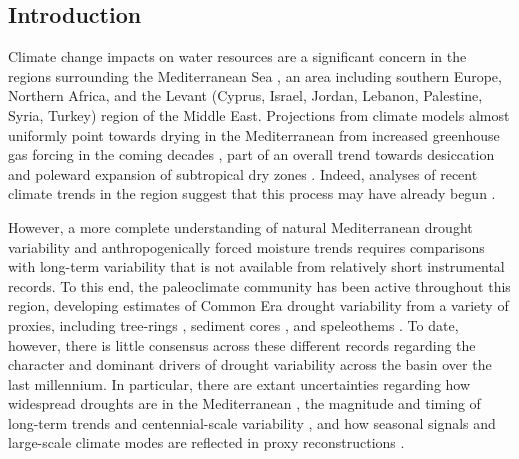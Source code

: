 \documentclass[draft,jgr]{AGUTeX}
\begin{document}
\begin{article}

\section{Introduction}
\noindent Climate change impacts on water resources are a significant concern in the regions surrounding the Mediterranean Sea \citep{Iglesias2007,GarciaRuiz2011}, an area including southern Europe, Northern Africa, and the Levant (Cyprus, Israel, Jordan, Lebanon, Palestine, Syria, Turkey) region of the Middle East. Projections from climate models almost uniformly point towards drying in the Mediterranean from increased greenhouse gas forcing in the coming decades \citep{Giorgi2008,IPCC_Collins:etal2013,Seager2014med}, part of an overall trend towards desiccation and poleward expansion of subtropical dry zones \citep{Held:2006,Seager2010b}. Indeed, analyses of recent climate trends in the region suggest that this process may have already begun \citep{GarciaRuiz2011,Gleick2014,Hoerling2012c,Kelley2012,Kelley2015}. 

\indent However, a more complete understanding of natural Mediterranean drought variability and anthropogenically forced moisture trends requires comparisons with long-term variability that is not available from relatively short instrumental records. To this end, the paleoclimate community has been active throughout this region, developing estimates of Common Era drought variability from a variety of proxies, including tree-rings \citep{Chbouki:etal1995,Glueck:Stockton2001,Touchan:etal2003,Akkemik:Aras2005,Touchan:etal2005,Esper:etal2007a,Andreu:etal2007,Nicault:etal2008,Touchan:etal2008a,Buntgen:etal2010,Touchan:etal2010a,Kose:etal2011,Touchan:etal2014a}, sediment cores \citep[e.g.,][]{Jones:etal2006,Roberts:etal2012,Moreno:etal2012}, and speleothems \citep[e.g.,][]{Jex:etal2011,Wassenburg:etal2013}. To date, however, there is little consensus across these different records regarding the character and dominant drivers of drought variability across the basin over the last millennium. In particular, there are extant uncertainties regarding how widespread droughts are in the Mediterranean \citep{Roberts:etal2012}, the magnitude and timing of long-term trends and centennial-scale variability \citep{Esper:etal2007a,Touchan:etal2010a,Wassenburg:etal2013}, and how seasonal signals and large-scale climate modes are reflected in proxy reconstructions \citep{Touchan:etal2014a,Touchan:etal2014b,Seim:etal2014}.


\end{article}
\end{document}
